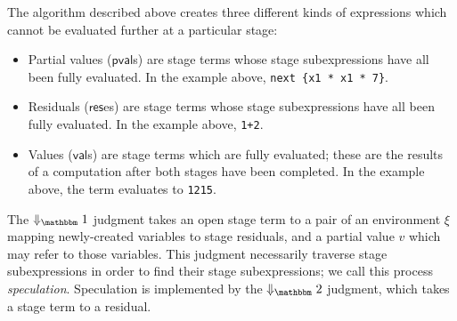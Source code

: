 

\newcommand{\pval}{\ensuremath{\mathsf{pval}}}
\newcommand{\res}{\ensuremath{\mathsf{res}}}
\renewcommand{\val}{\ensuremath{\mathsf{val}}}

The algorithm described above creates three different kinds of expressions which
cannot be evaluated further at a particular stage:
\begin{itemize}
\item Partial values ($\pval$s) are stage \bbone{} terms whose stage \bbone{}
subexpressions have all been fully evaluated. In the example above,
\verb|next {x1 * x1 * 7}|.
\item Residuals ($\res$es) are stage \bbtwo{} terms whose stage \bbone{}
subexpressions have all been fully evaluated. In the example above,
\verb|1+2|.
\item Values ($\val$s) are stage \bbtwo{} terms which are fully evaluated; these
are the results of a computation after both stages have been completed. In the
example above, the term evaluates to \verb|1215|.
\end{itemize}
The $\redonesym$ judgment takes an open stage \bbone{} term to a pair of an
environment $\xi$ mapping newly-created variables to stage \bbtwo{} residuals,
and a partial value $v$ which may refer to those variables. This judgment
necessarily traverse stage \bbtwo{} subexpressions in order to find their stage
\bbone{} subexpressions; we call this process \emph{speculation}. Speculation is
implemented by the $\redtwosym$ judgment, which takes a stage \bbtwo{} term to a
residual.

